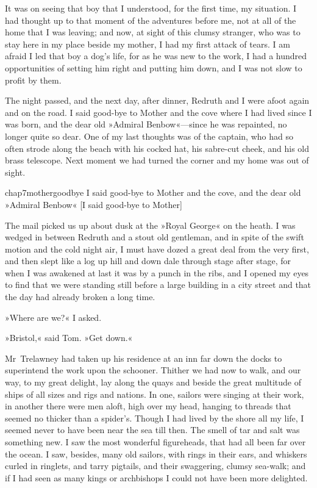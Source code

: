It was on seeing that boy that I understood, for the first time, my situation. I had thought up to that moment of the adventures before me, not at all of the home that I was leaving; and now, at sight of this clumsy stranger, who was to stay here in my place beside my mother, I had my first attack of tears. I am afraid I led that boy a dog's life, for as he was new to the work, I had a hundred opportunities of setting him right and putting him down, and I was not slow to profit by them.

 

The night passed, and the next day, after dinner, Redruth and I were afoot again and on the road. I said good-bye to Mother and the cove where I had lived since I was born, and the dear old »Admiral Benbow«—since he was repainted, no longer quite so dear. One of my last thoughts was of the captain, who had so often strode along the beach with his cocked hat, his sabre-cut cheek, and his old brass telescope. Next moment we had turned the corner and my home was out of sight.


\begin{bwbigpic}
	[\picsize]
	{chap7mothergoodbye}
	{I said good-bye to Mother and the cove, and the dear old »Admiral Benbow«}
	[I said good-bye to Mother]
\end{bwbigpic}


The mail picked us up about dusk at the »Royal George« on the heath. I was wedged in between Redruth and a stout old gentleman, and in spite of the swift motion and the cold night air, I must have dozed a great deal from the very first, and then slept like a log up hill and down dale through stage after stage, for when I was awakened at last it was by a punch in the ribs, and I opened my eyes to find that we were standing still before a large building in a city street and that the day had already broken a long time.

»Where are we?« I asked.

»Bristol,« said Tom. »Get down.«

Mr~Trelawney had taken up his residence at an inn far down the docks to superintend the work upon the schooner. Thither we had now to walk, and our way, to my great delight, lay along the quays and beside the great multitude of ships of all sizes and rigs and nations. In one, sailors were singing at their work, in another there were men aloft, high over my head, hanging to threads that seemed no thicker than a spider's. Though I had lived by the shore all my life, I seemed never to have been near the sea till then. The smell of tar and salt was something new. I saw the most wonderful figureheads, that had all been far over the ocean. I saw, besides, many old sailors, with rings in their ears, and whiskers curled in ringlets, and tarry pigtails, and their swaggering, clumsy sea-walk; and if I had seen as many kings or archbishops I could not have been more delighted.

